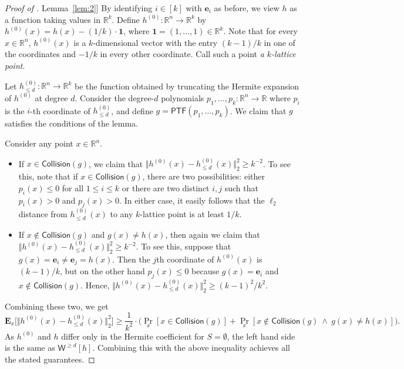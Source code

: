 \documentclass[11pt]{article}
\numberwithin{equation}{section}
\theoremstyle{definition}
\theoremstyle{plain}
\newcommand{\R}{\mathbb R}
\newcommand{\expref}[2]{\hyperref[#2]{#1~\ref{#2}}}
\begin{document}
\begin{proof}[Proof of \expref{Lemma}{lem:2}]
    By identifying $i \in [k]$ with $\mathbf{e}_i$ as before, we view $h$ as a
    function taking values in $\R^k$. Define $h^{(0)} : \mathbb{R}^n
    \rightarrow \mathbb{R}^k $ by $h^{(0)} (x) = h(x) -({1}/{k}) \cdot
    \mathbf{1}$, where $\mathbf{1} = (1, \ldots, 1) \in \R^k$. Note that for
    every $x \in \R^n$, $h^{(0)}(x)$
    is a $k$-dimensional vector with
    the entry $(k-1)/k$ in one of the coordinates and $-1/k$ in every other
    coordinate. Call such a point \emph{a $k$-lattice point}.  

Let $h^{(0)}_{\le d} : \mathbb{R}^n \rightarrow \mathbb{R}^k$ be the function
obtained by truncating the Hermite expansion of $h^{(0)}$ at degree $d$.
Consider the degree-$d$ polynomials $p_1, \ldots, p_k: \mathbb{R}^n \rightarrow
\mathbb{R}$ where $p_i$ is the $i$-{th} coordinate of $h^{(0)}_{\le d}$, and
define $g = \mathsf{PTF}(p_1, \ldots, p_k)$. We claim that $g$ satisfies
the conditions of the lemma.

Consider any point $x \in
\mathbb{R}^n$. 
\begin{itemize}
\item If $x \in \mathsf{Collision}(g)$, we claim that $\Vert h^{(0)} (x) -
    h^{(0)}_{\le d}(x)  \Vert_2^2 \ge k^{-2}$. To see this, note that if $x \in
    \mathsf{Collision}(g)$, there are two possibilities: either $p_i(x) \le 0$
    for all $1 \le i \le k$ or there are two distinct $i,j$ such that
    $p_i(x) > 0$ and $p_j(x) > 0$. In either case, it
    easily follows that the $\ell_2$ distance from
    $h^{(0)}_{\le d}(x)$ to any $k$-lattice point is at least $1/k$.

\item If $x \not \in \mathsf{Collision}(g)$ and $g(x) \neq  h(x)$, then again
    we claim that $\Vert h^{(0)} (x) - h^{(0)}_{\le d}(x)  \Vert_2^2 \ge
    k^{-2}$. To see this, suppose that $g(x) = \mathbf{e}_i \ne \mathbf{e}_j = h(x)$.
    Then the $j$th coordinate of $h^{(0)}(x)$ is $(k-1)/k$, but on the other hand
    $p_j(x) \le 0$ because $g(x) = \mathbf{e}_i$ and $x \not \in \mathsf{Collision}(g)$.
    Hence,
    $\Vert h^{(0)} (x) - h^{(0)}_{\le d}(x)\Vert_2^2 \ge {(k-1)^2}/{k^2}$. 
\end{itemize}
Combining these two, we get 
\[
\mathbf{E}_{x } \big[ \Vert h^{(0)} (x) - h^{(0)}_{\le d}(x)\Vert_2^2 \big] \geq \frac{1}{k^2} \cdot  \big( \Pr_{x } [x \in \mathsf{Collision}(g)] +  \Pr_{x } [x \not \in \mathsf{Collision}(g) \ \wedge \ g(x) \neq  h(x) ]\big). 
\]
As $h^{(0)}$ and $h$ differ only in the Hermite coefficient for $S = \emptyset$, the left hand side is the same as $ \mathsf{W}^{\ge d}[h]$. Combining this with the above inequality achieves all the stated guarantees. 
\end{proof}
\end{document}
